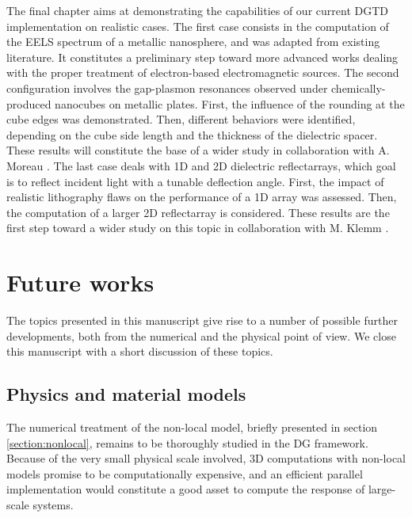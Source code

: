 The final chapter aims at demonstrating the capabilities of our current DGTD implementation on realistic cases. The first case consists in the computation of the EELS spectrum of a metallic nanosphere, and was adapted from existing literature. It constitutes a preliminary step toward more advanced works dealing with the proper treatment of electron-based electromagnetic sources. The second configuration involves the gap-plasmon resonances observed under chemically-produced nanocubes on metallic plates. First, the influence of the rounding at the cube edges was demonstrated. Then, different behaviors were identified, depending on the cube side length and the thickness of the dielectric spacer. These results will constitute the base of a wider study in collaboration with A. Moreau \cite{Moreau2}. The last case deals with 1D and 2D dielectric reflectarrays, which goal is to reflect incident light with a tunable deflection angle. First, the impact of realistic lithography flaws on the performance of a 1D array was assessed. Then, the computation of a larger 2D reflectarray is considered. These results are the first step toward a wider study on this topic in collaboration with M. Klemm \cite{Zou2}.

\section{Future works}

The topics presented in this manuscript give rise to a number of possible further developments, both from the numerical and the physical point of view. We close this manuscript with a short discussion of these topics.

\subsection{Physics and material models}

The numerical treatment of the non-local model, briefly presented in section \ref{section:nonlocal}, remains to be thoroughly studied in the DG framework. Because of the very small physical scale involved, 3D computations with non-local models promise to be computationally expensive, and an efficient parallel implementation would constitute a good asset to compute the response of large-scale systems.

